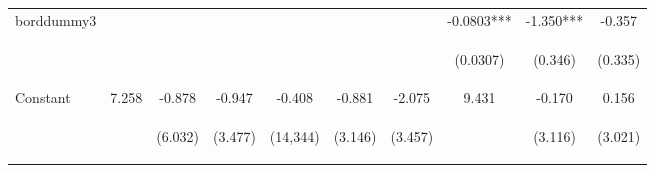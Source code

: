 \documentclass{article}[11pt,subeqn]
\begin{document}
\begin{spacing}{1.25}
\begin{sidewaystable}[!htbp]
\begin{center}
\begin{tabular}{lccccccccc}
borddummy3 &  &  &  &  &  &  & -0.0803*** & -1.350*** & -0.357 \\
\vspace{4pt} & \begin{footnotesize}\end{footnotesize} & \begin{footnotesize}\end{footnotesize} & \begin{footnotesize}\end{footnotesize} & \begin{footnotesize}\end{footnotesize} & \begin{footnotesize}\end{footnotesize} & \begin{footnotesize}\end{footnotesize} & \begin{footnotesize}(0.0307)\end{footnotesize} & \begin{footnotesize}(0.346)\end{footnotesize} & \begin{footnotesize}(0.335)\end{footnotesize} \\
Constant & 7.258 & -0.878 & -0.947 & -0.408 & -0.881 & -2.075 & 9.431 & -0.170 & 0.156 \\
 & \begin{footnotesize}\end{footnotesize} & \begin{footnotesize}(6.032)\end{footnotesize} & \begin{footnotesize}(3.477)\end{footnotesize} & \begin{footnotesize}(14,344)\end{footnotesize} & \begin{footnotesize}(3.146)\end{footnotesize} & \begin{footnotesize}(3.457)\end{footnotesize} & \begin{footnotesize}\end{footnotesize} & \begin{footnotesize}(3.116)\end{footnotesize} & \begin{footnotesize}(3.021)\end{footnotesize} \\

\end{tabular}
\end{center}
\end{sidewaystable}
\end{spacing}
\end{document}
